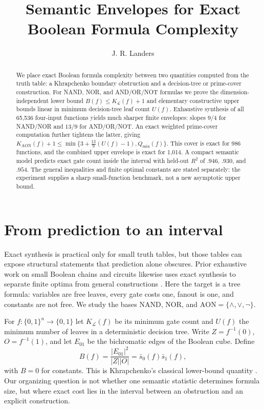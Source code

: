 \documentclass[10pt]{article}
\title{\vspace{-1.8em}\textbf{Semantic Envelopes for Exact}\\[-1pt]
\textbf{Boolean Formula Complexity}}
\author{J. R. Landers}
\date{\vspace{-1.5em}}
\newcommand{\AON}{\mathrm{AON}}
\begin{document}
\maketitle
\vspace{-1.7em}

\begin{abstract}
We place exact Boolean formula complexity between two quantities computed from
the truth table: a Khrapchenko boundary obstruction and a decision-tree or
prime-cover construction.  For NAND, NOR, and AND/OR/NOT formulas we prove the
dimension-independent lower bound $B(f)\le K_{\mathcal L}(f)+1$ and elementary
constructive upper bounds linear in minimum decision-tree leaf count $U(f)$.
Exhaustive synthesis of all 65,536 four-input functions yields much sharper
finite envelopes: slopes $9/4$ for NAND/NOR and $13/9$ for AND/OR/NOT.  An
exact weighted prime-cover computation further tightens the latter, giving
$K_{\AON}(f)+1\le\min\{3+\frac{13}{9}(U(f)-1),Q_{\min}(f)\}$.  This cover is
exact for 986 functions, and the combined upper envelope is exact for 1,014.
A compact semantic model predicts exact gate count inside the interval with
held-out $R^2$ of $.946$, $.930$, and $.954$.  The general inequalities and
finite optimal constants are stated separately: the experiment supplies a
sharp small-function benchmark, not a new asymptotic upper bound.
\end{abstract}

\section{From prediction to an interval}

Exact synthesis is practical only for small truth tables, but those tables can
expose structural statements that prediction alone obscures.  Prior exhaustive
work on small Boolean chains and circuits likewise uses exact synthesis to
separate finite optima from general constructions
\cite{haaswijk2017,turan2015}.  Here the target is a tree formula: variables
are free leaves, every gate costs one, fanout is one, and constants are not
free.  We study the bases NAND, NOR, and
$\AON=\{\wedge,\vee,\neg\}$.

For $f:\{0,1\}^n\to\{0,1\}$ let $K_{\mathcal L}(f)$ be its minimum gate
count and $U(f)$ the minimum number of leaves in a deterministic decision
tree.  Write $Z=f^{-1}(0)$, $O=f^{-1}(1)$, and let $E_{01}$ be the
bichromatic edges of the Boolean cube.  Define
\begin{equation}
 B(f)=\frac{|E_{01}|^2}{|Z||O|}
      =\bar s_0(f)\bar s_1(f),
\end{equation}
with $B=0$ for constants.  This is Khrapchenko's classical lower-bound
quantity \cite{khrapchenko1971,jukna2012}.  Our organizing question is not
whether one semantic statistic determines formula size, but where exact cost
lies in the interval between an obstruction and an explicit construction.
\end{document}

